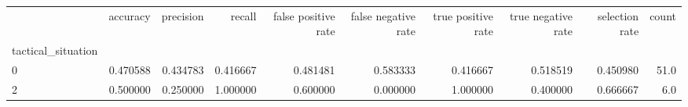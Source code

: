 \begin{tabular}{lrrrrrrrrr}
\toprule
{} &  accuracy &  precision &    recall &  false positive rate &  false negative rate &  true positive rate &  true negative rate &  selection rate &  count \\
tactical\_situation &           &            &           &                      &                      &                     &                     &                 &        \\
\midrule
0                  &  0.470588 &   0.434783 &  0.416667 &             0.481481 &             0.583333 &            0.416667 &            0.518519 &        0.450980 &   51.0 \\
2                  &  0.500000 &   0.250000 &  1.000000 &             0.600000 &             0.000000 &            1.000000 &            0.400000 &        0.666667 &    6.0 \\
\bottomrule
\end{tabular}
